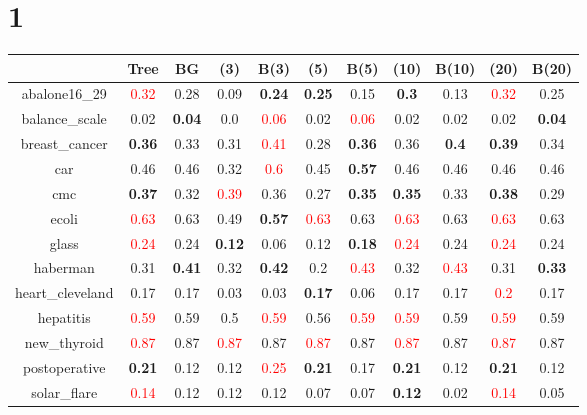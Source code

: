 \documentclass{article}%
\begin{document}
\section*{1}%
\begin{tabular}{c|cccccccccc}%
\hline%
&Tree&BG&(3)&B(3)&(5)&B(5)&(10)&B(10)&(20)&B(20)\\%
\hline%
abalone16\_29&\textcolor{red}{ 
0.32
}&0.28&0.09&\textbf{0.24}&\textbf{0.25}&0.15&\textbf{0.3}&0.13&\textcolor{red}{ 
0.32
}&0.25\\%
\hline%
balance\_scale&0.02&\textbf{0.04}&0.0&\textcolor{red}{ 
0.06
}&0.02&\textcolor{red}{ 
0.06
}&0.02&0.02&0.02&\textbf{0.04}\\%
\hline%
breast\_cancer&\textbf{0.36}&0.33&0.31&\textcolor{red}{ 
0.41
}&0.28&\textbf{0.36}&0.36&\textbf{0.4}&\textbf{0.39}&0.34\\%
\hline%
car&0.46&0.46&0.32&\textcolor{red}{ 
0.6
}&0.45&\textbf{0.57}&0.46&0.46&0.46&0.46\\%
\hline%
cmc&\textbf{0.37}&0.32&\textcolor{red}{ 
0.39
}&0.36&0.27&\textbf{0.35}&\textbf{0.35}&0.33&\textbf{0.38}&0.29\\%
\hline%
ecoli&\textcolor{red}{ 
0.63
}&0.63&0.49&\textbf{0.57}&\textcolor{red}{ 
0.63
}&0.63&\textcolor{red}{ 
0.63
}&0.63&\textcolor{red}{ 
0.63
}&0.63\\%
\hline%
glass&\textcolor{red}{ 
0.24
}&0.24&\textbf{0.12}&0.06&0.12&\textbf{0.18}&\textcolor{red}{ 
0.24
}&0.24&\textcolor{red}{ 
0.24
}&0.24\\%
\hline%
haberman&0.31&\textbf{0.41}&0.32&\textbf{0.42}&0.2&\textcolor{red}{ 
0.43
}&0.32&\textcolor{red}{ 
0.43
}&0.31&\textbf{0.33}\\%
\hline%
heart\_cleveland&0.17&0.17&0.03&0.03&\textbf{0.17}&0.06&0.17&0.17&\textcolor{red}{ 
0.2
}&0.17\\%
\hline%
hepatitis&\textcolor{red}{ 
0.59
}&0.59&0.5&\textcolor{red}{ 
0.59
}&0.56&\textcolor{red}{ 
0.59
}&\textcolor{red}{ 
0.59
}&0.59&\textcolor{red}{ 
0.59
}&0.59\\%
\hline%
new\_thyroid&\textcolor{red}{ 
0.87
}&0.87&\textcolor{red}{ 
0.87
}&0.87&\textcolor{red}{ 
0.87
}&0.87&\textcolor{red}{ 
0.87
}&0.87&\textcolor{red}{ 
0.87
}&0.87\\%
\hline%
postoperative&\textbf{0.21}&0.12&0.12&\textcolor{red}{ 
0.25
}&\textbf{0.21}&0.17&\textbf{0.21}&0.12&\textbf{0.21}&0.12\\%
\hline%
solar\_flare&\textcolor{red}{ 
0.14
}&0.12&0.12&0.12&0.07&0.07&\textbf{0.12}&0.02&\textcolor{red}{ 
0.14
}&0.05\\%

\end{tabular}
\end{document}
